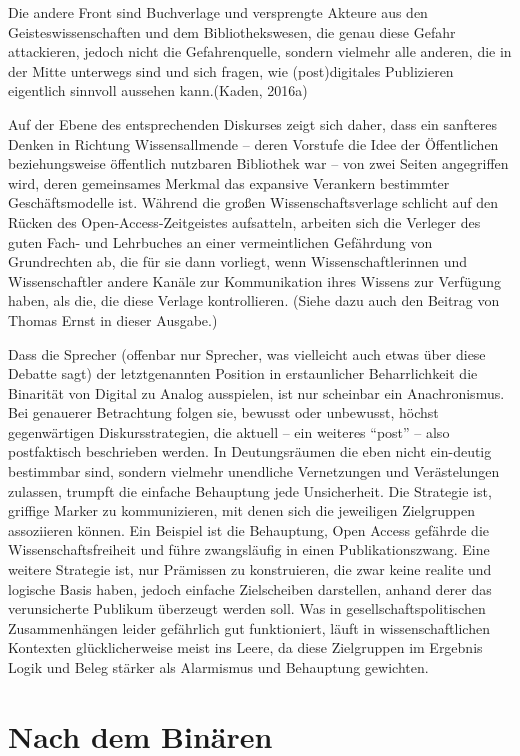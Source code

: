 \documentclass[a4paper,
fontsize=11pt,
oneside,
numbers=noperiodatend,
parskip=half-,
bibliography=totoc,
final
]{scrartcl}
\begin{document}
Die andere Front sind Buchverlage und versprengte Akteure aus den
Geisteswissenschaften und dem Bibliothekswesen, die genau diese Gefahr
attackieren, jedoch nicht die Gefahrenquelle, sondern vielmehr alle
anderen, die in der Mitte unterwegs sind und sich fragen, wie
(post)digitales Publizieren eigentlich sinnvoll aussehen kann.(Kaden,
2016a)

Auf der Ebene des entsprechenden Diskurses zeigt sich daher, dass ein
sanfteres Denken in Richtung Wissensallmende -- deren Vorstufe die Idee
der Öffentlichen beziehungsweise öffentlich nutzbaren Bibliothek war --
von zwei Seiten angegriffen wird, deren gemeinsames Merkmal das
expansive Verankern bestimmter Geschäftsmodelle ist. Während die großen
Wissenschaftsverlage schlicht auf den Rücken des Open-Access-Zeitgeistes
aufsatteln, arbeiten sich die Verleger des guten Fach- und Lehrbuches an
einer vermeintlichen Gefährdung von Grundrechten ab, die für sie dann
vorliegt, wenn Wissenschaftlerinnen und Wissenschaftler andere Kanäle
zur Kommunikation ihres Wissens zur Verfügung haben, als die, die diese
Verlage kontrollieren. (Siehe dazu auch den Beitrag von Thomas Ernst in
dieser Ausgabe.)

Dass die Sprecher (offenbar nur Sprecher, was vielleicht auch etwas über
diese Debatte sagt) der letztgenannten Position in erstaunlicher
Beharrlichkeit die Binarität von Digital zu Analog ausspielen, ist nur
scheinbar ein Anachronismus. Bei genauerer Betrachtung folgen sie,
bewusst oder unbewusst, höchst gegenwärtigen Diskursstrategien, die
aktuell -- ein weiteres \enquote{post} -- also postfaktisch beschrieben
werden. In Deutungsräumen die eben nicht ein-deutig bestimmbar sind,
sondern vielmehr unendliche Vernetzungen und Verästelungen zulassen,
trumpft die einfache Behauptung jede Unsicherheit. Die Strategie ist,
griffige Marker zu kommunizieren, mit denen sich die jeweiligen
Zielgruppen assoziieren können. Ein Beispiel ist die Behauptung, Open
Access gefährde die Wissenschaftsfreiheit und führe zwangsläufig in
einen Publikationszwang. Eine weitere Strategie ist, nur Prämissen zu
konstruieren, die zwar keine realite und logische Basis haben, jedoch
einfache Zielscheiben darstellen, anhand derer das verunsicherte
Publikum überzeugt werden soll. Was in gesellschaftspolitischen
Zusammenhängen leider gefährlich gut funktioniert, läuft in
wissenschaftlichen Kontexten glücklicherweise meist ins Leere, da diese
Zielgruppen im Ergebnis Logik und Beleg stärker als Alarmismus und
Behauptung gewichten.

\section*{Nach dem Binären}\label{nach-dem-binuxe4ren}
\end{document}

